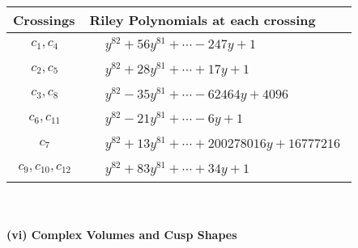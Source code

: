 \documentclass[1p]{elsarticle_modified}
\theoremstyle{definition}
\begin{document}
\begin{tabular}{m{50pt}|m{274pt}}
Crossings & \hspace{64pt}Riley Polynomials at each crossing \\
\hline $$\begin{aligned}c_{1},c_{4}\end{aligned}$$&$\begin{aligned}
&y^{82}+56 y^{81}+\cdots-247 y+1
\end{aligned}$\\
\hline $$\begin{aligned}c_{2},c_{5}\end{aligned}$$&$\begin{aligned}
&y^{82}+28 y^{81}+\cdots+17 y+1
\end{aligned}$\\
\hline $$\begin{aligned}c_{3},c_{8}\end{aligned}$$&$\begin{aligned}
&y^{82}-35 y^{81}+\cdots-62464 y+4096
\end{aligned}$\\
\hline $$\begin{aligned}c_{6},c_{11}\end{aligned}$$&$\begin{aligned}
&y^{82}-21 y^{81}+\cdots-6 y+1
\end{aligned}$\\
\hline $$\begin{aligned}c_{7}\end{aligned}$$&$\begin{aligned}
&y^{82}+13 y^{81}+\cdots+200278016 y+16777216
\end{aligned}$\\
\hline $$\begin{aligned}c_{9},c_{10},c_{12}\end{aligned}$$&$\begin{aligned}
&y^{82}+83 y^{81}+\cdots+34 y+1
\end{aligned}$\\
\hline
\end{tabular}\\~\\
\newpage\flushleft \textbf{(vi) Complex Volumes and Cusp Shapes}
\end{document}

